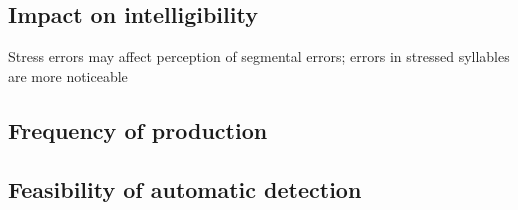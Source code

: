 		\subsection{Impact on intelligibility}
		\label{sec:targeting:intelligibility}
		\citep{Warren2009}
		
		\citep{Magen1998}
		
		Stress errors may affect perception of segmental errors; errors in stressed syllables are more noticeable \citep{Cutler2005}
				
		
		\subsection{Frequency of production}
		\label{sec:targeting:frequency}
		\citep{Cutler2005}
		
		\citep{Peperkamp2002, Dupoux2001, Dupoux2008}
		
		\subsection{Feasibility of automatic detection}
		\label{sec:targeting:autodetect}
		\citep{ISADEPT, Delmonte2011}
		
		\citep{Bonneau2011}
		
		\citep{Shahin2012a}
		

	

